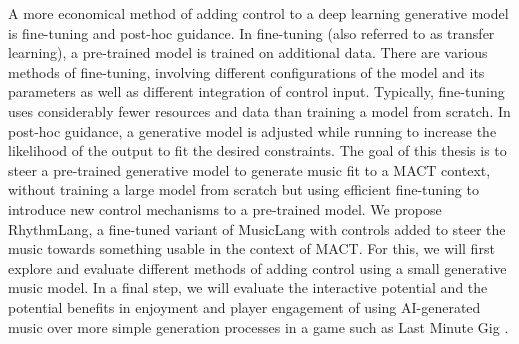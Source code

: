 A more economical method of adding control to a deep learning generative model is fine-tuning and post-hoc guidance. In fine-tuning (also referred to as transfer learning), a pre-trained model is trained on additional data. There are various methods of fine-tuning, involving different configurations of the model and its parameters as well as different integration of control input. Typically, fine-tuning uses considerably fewer resources and data than training a model from scratch. In post-hoc guidance, a generative model is adjusted while running to increase the likelihood of the output to fit the desired constraints. The goal of this thesis is to steer a pre-trained generative model to generate music fit to a MACT context, without training a large model from scratch but using efficient fine-tuning to introduce new control mechanisms to a pre-trained model. We propose RhythmLang, a fine-tuned variant of MusicLang with controls added to steer the music towards something usable in the context of MACT. For this, we will first explore and evaluate different methods of adding control using a small generative music model. In a final step, we will evaluate the interactive potential and the potential benefits in enjoyment and player engagement of using AI-generated music over more simple generation processes in a game such as Last Minute Gig \cite{Chalkiadakis_2022}.

